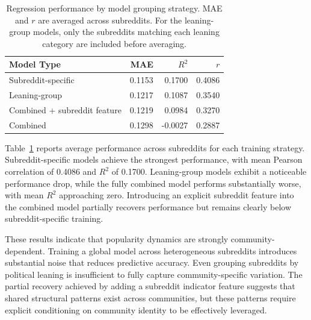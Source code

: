 \begin{table}[htbp]
\centering
\caption{Regression performance by model grouping strategy. MAE and $r$ are averaged across subreddits. For the leaning-group models, only the subreddits matching each leaning category are included before averaging.}
\label{tab:model_grouping}
\begin{tabular}{lrrr}
\toprule
Model Type & MAE & $R^2$ & $r$ \\
\midrule
Subreddit-specific  & 0.1153 & 0.1700 & 0.4086 \\
Leaning-group       & 0.1217 & 0.1087 & 0.3540 \\
Combined + subreddit feature & 0.1219 & 0.0984 & 0.3270 \\
Combined            & 0.1298 & -0.0027 & 0.2887 \\
\bottomrule
\end{tabular}
\end{table}

Table~\ref{tab:model_grouping} reports average performance across subreddits for each training strategy. Subreddit-specific models achieve the strongest performance, with mean Pearson correlation of 0.4086 and $R^2$ of 0.1700. Leaning-group models exhibit a noticeable performance drop, while the fully combined model performs substantially worse, with mean $R^2$ approaching zero. Introducing an explicit subreddit feature into the combined model partially recovers performance but remains clearly below subreddit-specific training.

These results indicate that popularity dynamics are strongly community-dependent. Training a global model across heterogeneous subreddits introduces substantial noise that reduces predictive accuracy. Even grouping subreddits by political leaning is insufficient to fully capture community-specific variation. The partial recovery achieved by adding a subreddit indicator feature suggests that shared structural patterns exist across communities, but these patterns require explicit conditioning on community identity to be effectively leveraged.

